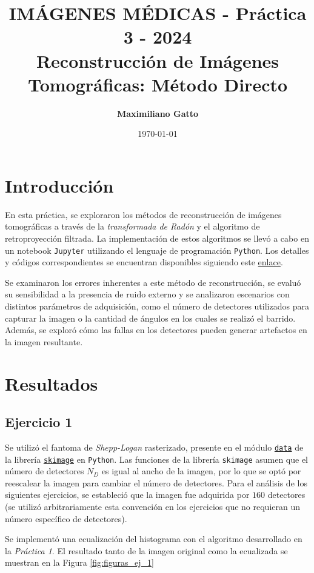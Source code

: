 \documentclass[11pt, twocolumn]{article}
\title{{\large IMÁGENES MÉDICAS - Práctica 3 - 2024} \\ \vspace{1cm}\textbf{Reconstrucción de Imágenes Tomográficas: Método Directo}}
\author[ ]{\textbf{Maximiliano Gatto}}
\affil[ ]{Instituto Balseiro (UNCuyo - CNEA) - Bariloche, Río Negro, Argentina\vspace{0.4cm}}
\affil[ ]{\href{mailto:maximiliano.gatto@ib.edu.ar}{maximiliano.gatto@ib.edu.ar}}
\date{\today}
\begin{document}
\maketitle

\section{Introducción}
En esta práctica, se exploraron los métodos de reconstrucción de imágenes tomográficas a través de la \textit{transformada de Radón} y el algoritmo de retroproyección filtrada. La implementación de estos algoritmos se llevó a cabo en un notebook \texttt{Jupyter} utilizando el lenguaje de programación \texttt{Python}. Los detalles y códigos correspondientes se encuentran disponibles siguiendo este \href{}{enlace}.

Se examinaron los errores inherentes a este método de reconstrucción, se evaluó su sensibilidad a la presencia de ruido externo y se analizaron escenarios con distintos parámetros de adquisición, como el número de detectores utilizados para capturar la imagen o la cantidad de ángulos en los cuales se realizó el barrido. Además, se exploró cómo las fallas en los detectores pueden generar artefactos en la imagen resultante.

\section{Resultados}

\subsection*{Ejercicio 1}
Se utilizó el fantoma de \textit{Shepp-Logan} rasterizado, presente en el módulo \href{https://scikit-image.org/docs/stable/api/skimage.data.html}{\texttt{data}} de la librería \href{https://scikit-image.org}{\texttt{skimage}} en \texttt{Python}. Las funciones de la librería \texttt{skimage} asumen que el número de detectores $N_D$ es igual al ancho de la imagen, por lo que se optó por reescalear la imagen para cambiar el número de detectores. Para el análisis de los siguientes ejercicios, se estableció que la imagen fue adquirida por $160$ detectores (se utilizó arbitrariamente esta convención en los ejercicios que no requieran un número específico de detectores). 

Se implementó una ecualización del histograma con el algoritmo desarrollado en la \textit{Práctica 1}. El resultado tanto de la imagen original como la ecualizada se muestran en la Figura \ref{fig:figuras_ej_1}
\end{document}
